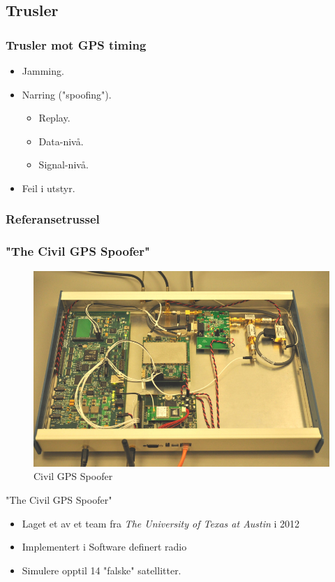 \documentclass[xcolor=table]{beamer}
\begin{document}
\subsection{Trusler}
\begin{frame}
  \frametitle{Trusler mot GPS timing}
  \begin{itemize}
    \item Jamming. 
    \item Narring ("spoofing").
    \begin{itemize}
      \item Replay.
      \item Data-nivå. 
      \item Signal-nivå.
    \end{itemize}
    \item Feil i utstyr.
  \end{itemize}    
\end{frame}

\subsubsection{Referansetrussel}
\begin{frame}
  \frametitle{"The Civil GPS Spoofer"}
  \begin{figure}
    \includegraphics[scale=0.2]{pics/texas_spoofer.jpg}
    \caption{Civil GPS Spoofer}
  \end{figure}
  "The Civil GPS Spoofer"
  \begin{itemize}
    \item Laget et av et team fra \textit{The University of Texas at Austin} i 2012 \cite{EVPMUGA}
    \item Implementert i Software definert radio
    \item Simulere opptil 14 "falske" satellitter.
  \end{itemize}
\end{frame}
\end{document}
